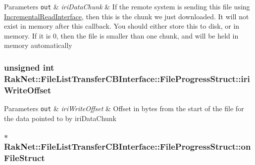 \begin{DoxyParams}[1]{Parameters}
\mbox{\tt out}  & {\em iri\-Data\-Chunk} & If the remote system is sending this file using \hyperlink{class_rak_net_1_1_incremental_read_interface}{Incremental\-Read\-Interface}, then this is the chunk we just downloaded. It will not exist in memory after this callback. You should either store this to disk, or in memory. If it is 0, then the file is smaller than one chunk, and will be held in memory automatically \\
\hline
\end{DoxyParams}
\hypertarget{struct_rak_net_1_1_file_list_transfer_c_b_interface_1_1_file_progress_struct_a70be2afefa74cb197afc40cbdf33fc3b}{
\subsubsection[{iri\-Write\-Offset}]{\setlength{\rightskip}{0pt plus 5cm}unsigned int Rak\-Net\-::\-File\-List\-Transfer\-C\-B\-Interface\-::\-File\-Progress\-Struct\-::iri\-Write\-Offset}}\label{struct_rak_net_1_1_file_list_transfer_c_b_interface_1_1_file_progress_struct_a70be2afefa74cb197afc40cbdf33fc3b}

\begin{DoxyParams}[1]{Parameters}
\mbox{\tt out}  & {\em iri\-Write\-Offset} & Offset in bytes from the start of the file for the data pointed to by iri\-Data\-Chunk \\
\hline
\end{DoxyParams}
\hypertarget{struct_rak_net_1_1_file_list_transfer_c_b_interface_1_1_file_progress_struct_ad61495fa29afef7760d47326009afe80}{
\subsubsection[{on\-File\-Struct}]{$\ast$ Rak\-Net\-::\-File\-List\-Transfer\-C\-B\-Interface\-::\-File\-Progress\-Struct\-::on\-File\-Struct}}\label{struct_rak_net_1_1_file_list_transfer_c_b_interface_1_1_file_progress_struct_ad61495fa29afef7760d47326009afe80}

